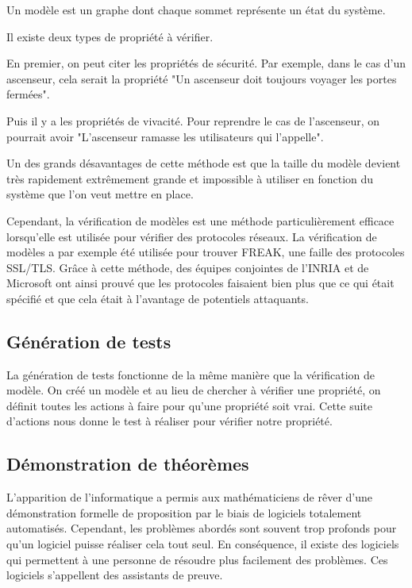 \documentclass[12pt]{report}
\begin{document}
Un modèle est un graphe dont chaque sommet représente un état du système.

Il existe deux types de propriété à vérifier.

En premier, on peut citer les propriétés de sécurité. Par exemple, dans le cas d'un ascenseur, cela serait la propriété "Un ascenseur doit toujours voyager les portes fermées".

Puis il y a les propriétés de vivacité. Pour reprendre le cas de l'ascenseur, on pourrait avoir "L'ascenseur ramasse les utilisateurs qui l'appelle".   

Un des grands désavantages de cette méthode est que la taille du modèle devient très rapidement extrêmement grande et impossible à utiliser en fonction du système que l'on veut mettre en place.
   
Cependant, la vérification de modèles est une méthode particulièrement efficace lorsqu'elle est utilisée pour vérifier des protocoles réseaux. La vérification de modèles a par exemple été utilisée pour trouver FREAK, une faille des protocoles SSL/TLS. Grâce à cette méthode, des équipes conjointes de l'INRIA et de Microsoft ont ainsi prouvé que les protocoles faisaient bien plus que ce qui était spécifié et que cela était à l'avantage de potentiels attaquants\cite{goubault}.    

\subsection{Génération de tests}
La génération de tests fonctionne de la même manière que la vérification de modèle. On créé un modèle et au lieu de chercher à vérifier une propriété, on définit toutes les actions à faire pour qu'une propriété soit vrai. Cette suite d'actions nous donne le test à réaliser pour vérifier notre propriété\cite{griffault}.

\subsection{Démonstration de théorèmes}
L'apparition de l'informatique a permis aux mathématiciens de rêver d'une démonstration formelle de proposition par le biais de logiciels totalement automatisés. Cependant, les problèmes abordés sont souvent trop profonds pour qu'un logiciel puisse réaliser cela tout seul. En conséquence, il existe des logiciels qui permettent à une personne de résoudre plus facilement des problèmes. Ces logiciels s'appellent des assistants de preuve. 
\end{document}

